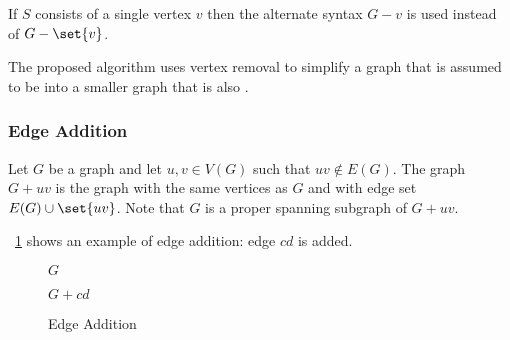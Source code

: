 If \(S\) consists of a single vertex \(v\) then the alternate syntax \(G-v\) is used instead of \(G-\set{v}\).

The proposed algorithm uses vertex removal to simplify a graph that is assumed to be  into a smaller
graph that is also .

\subsubsection{Edge Addition}\label{sec:sub:sub:eadd}

Let \(G\) be a graph and let \(u,v\in V(G)\) such that \(uv\notin E(G)\).  The graph \(G+uv\) is the graph with the
same vertices as \(G\) and with edge set \(E(G)\cup\set{uv}\).  Note that \(G\) is a proper spanning subgraph of
\(G+uv\).

\figurename~\ref{fig:eadd} shows an example of edge addition: edge \(cd\) is added.

\begin{figure}[H]
  \label{fig:eadd}
  \begin{minipage}{3in}
    \begin{center}

      \bigskip

      \(G\)
    \end{center}
  \end{minipage}
  \begin{minipage}{3in}
    \begin{center}

      \bigskip

      \(G+cd\)
    \end{center}
  \end{minipage}
  \caption{Edge Addition}
\end{figure}

